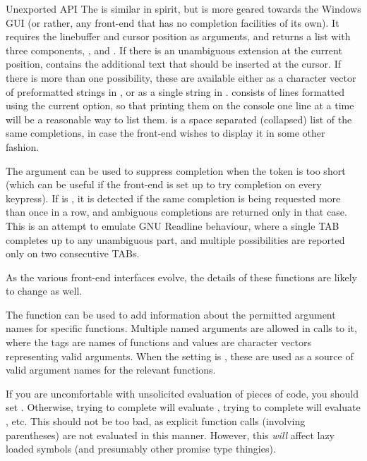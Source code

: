 \begin{Section}{Unexported API}
The  is similar in spirit, but is more
geared towards the Windows GUI (or rather, any front-end that has no
completion facilities of its own).  It requires the linebuffer
and cursor position as arguments, and returns a list with three
components, ,  and .  If
there is an unambiguous extension at the current position,
 contains the additional text that should be inserted
at the cursor.  If there is more than one possibility, these are
available either as a character vector of preformatted strings in
, or as a single string in .
 consists of lines formatted using the current
 option, so that printing them on the console one line at
a time will be a reasonable way to list them.   is a space
separated (collapsed) list of the same completions, in case the
front-end wishes to display it in some other fashion.

The  argument can be used to suppress completion when
the token is too short (which can be useful if the front-end is set up
to try completion on every keypress).  If  is
, it is detected if the same completion is being requested
more than once in a row, and ambiguous completions are returned only
in that case.  This is an attempt to emulate GNU Readline behaviour,
where a single TAB completes up to any unambiguous part, and multiple
possibilities are reported only on two consecutive TABs.

As the various front-end interfaces evolve, the details of these
functions are likely to change as well.

The function  can be used to add information
about the permitted argument names for specific functions.  Multiple
named arguments are allowed in calls to it, where the tags are names
of functions and values are character vectors representing valid
arguments.  When the  setting is , these are
used as a source of valid argument names for the relevant functions.
\end{Section}
%
\begin{Note}\relax
If you are uncomfortable with unsolicited evaluation of pieces of
code, you should set .  Otherwise, trying to
complete  will evaluate , trying to complete
 will evaluate , etc.  This
should not be too bad, as explicit function calls (involving
parentheses) are not evaluated in this manner.  However, this
\emph{will} affect lazy loaded symbols (and presumably other promise
type thingies).
\end{Note}
